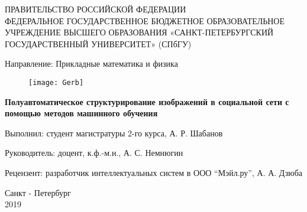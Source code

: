 \begin{titlepage}
		
\thispagestyle{empty}
		
  \begin{center}
  
   
   ПРАВИТЕЛЬСТВО РОССИЙСКОЙ ФЕДЕРАЦИИ \\
   
   \vspace{0.25cm}
   ФЕДЕРАЛЬНОЕ ГОСУДАРСТВЕННОЕ БЮДЖЕТНОЕ
   ОБРАЗОВАТЕЛЬНОЕ УЧРЕЖДЕНИЕ ВЫСШЕГО ОБРАЗОВАНИЯ 
   «САНКТ-ПЕТЕРБУРГСКИЙ ГОСУДАРСТВЕННЫЙ УНИВЕРСИТЕТ» 
   (СПбГУ)
   
   \vspace{0.25cm}
   Направление: Прикладные математика и физика
   
 
   \begin{figure}[h!]
   	\begin{center}
   		\texttt{[image: Gerb]}
   	\end{center}
   \end{figure}


     \textbf{\Large Полуавтоматическое структурирование
     изображений в социальной сети с помощью 
     методов машинного обучения}
     
 \bigskip

\vfill

\begin{flushright}
    \small{
    Выполнил: студент магистратуры 2-го курса, А. Р. Шабанов
    
    Руководитель: доцент, к.ф.-м.н., А. С. Немнюгин
    
    Рецензент: разработчик интеллектуальных систем в ООО “Мэйл.ру”, А. А. Дзюба
    }
\end{flushright}

\end{center}

\vfill

\newlength{\ML}


\begin{center}
    Санкт - Петербург \\
    2019
\end{center}

\end{titlepage}
